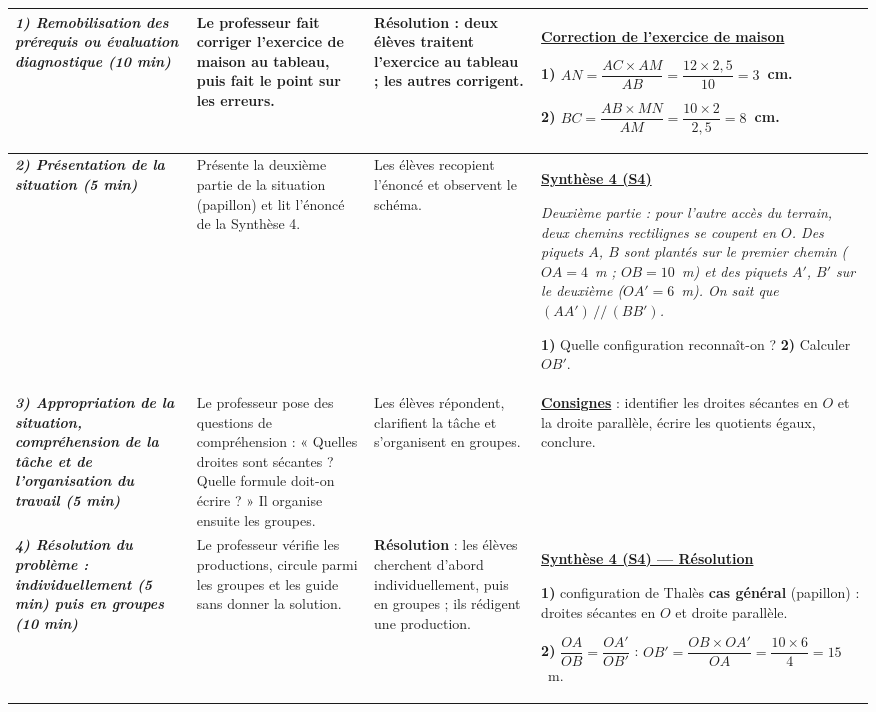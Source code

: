 \documentclass[10pt]{article}
\newcommand{\titreR}[1]{\underline{\textcolor{rougetitre}{\bfseries #1}}}
\newcommand{\seance}[1]{\fcolorbox{bleuseance}{bleufond}{\textcolor{bleuseance}{\bfseries #1}}}
\newcommand{\moment}[1]{\textbf{\itshape #1}}
\begin{document}
\begin{longtable}{|p{2.35cm}|p{5.35cm}|p{4.55cm}|p{13.85cm}|}
\hline
\seance{SEANCE 4} \newline \moment{1) Remobilisation des prérequis ou évaluation diagnostique (10 min)} &
Le professeur fait corriger l'exercice de maison au tableau, puis fait le point sur les erreurs. &
\textbf{Résolution} : deux élèves traitent l'exercice au tableau ; les autres corrigent. &
\titreR{Correction de l'exercice de maison} \par
\textbf{1)} $AN=\dfrac{AC\times AM}{AB}=\dfrac{12\times2{,}5}{10}=3$~cm. \par
\textbf{2)} $BC=\dfrac{AB\times MN}{AM}=\dfrac{10\times2}{2{,}5}=8$~cm. \\ \hline

\moment{2) Présentation de la situation (5 min)} &
Présente la deuxième partie de la situation (papillon) et lit l'énoncé de la
Synthèse 4. &
Les élèves recopient  l'énoncé et observent le schéma. &
\titreR{Synthèse 4 (S4)} \par
{\itshape Deuxième partie : pour l'autre accès du terrain, deux chemins rectilignes
se coupent en $O$. Des piquets $A$, $B$ sont plantés sur le premier chemin
($OA=4$~m ; $OB=10$~m) et des piquets $A'$, $B'$ sur le deuxième ($OA'=6$~m).
On sait que $(AA')\,//\,(BB')$.} \par
\textbf{1)} Quelle configuration reconnaît-on ? \textbf{2)} Calculer $OB'$. \\ \hline

\moment{3) Appropriation de la situation, compréhension de la tâche et de
l'organisation du travail (5 min)} &
Le professeur pose des questions de compréhension : « Quelles droites sont sécantes ? Quelle formule doit-on écrire ? » Il organise ensuite les groupes. &
Les élèves répondent, clarifient la tâche et s'organisent en groupes. &
\titreR{Consignes} : identifier les droites sécantes en $O$ et la droite parallèle,
écrire les quotients égaux, conclure. \\ \hline

\moment{4) Résolution du problème : individuellement (5 min) puis en groupes (10 min)} &
Le professeur vérifie les productions, circule parmi les groupes et les guide sans donner la solution. &
\textbf{Résolution} : les élèves cherchent d'abord individuellement, puis en groupes ; ils rédigent une production. &
\titreR{Synthèse 4 (S4) — Résolution} \par
\textbf{1)} configuration de Thalès \textbf{cas général} (papillon) : droites
sécantes en $O$ et droite parallèle. \par
\textbf{2)} $\dfrac{OA}{OB}=\dfrac{OA'}{OB'}$ :
$OB'=\dfrac{OB\times OA'}{OA}=\dfrac{10\times6}{4}=15$~m. \\ \hline


\end{longtable}
\end{document}
